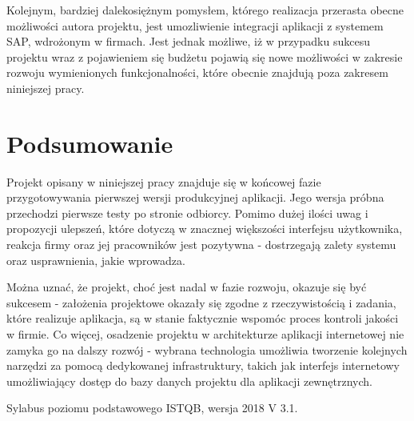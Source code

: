 \documentclass[declaration,shortabstract]{iithesis}
\begin{document}
Kolejnym, bardziej dalekosiężnym pomysłem, którego  realizacja przerasta obecne możliwości autora projektu, jest umozliwienie integracji aplikacji z systemem SAP, wdrożonym w firmach. 
Jest jednak możliwe, iż w przypadku sukcesu projektu wraz z pojawieniem się budżetu pojawią się nowe możliwości w zakresie rozwoju wymienionych funkcjonalności, które obecnie znajdują poza zakresem niniejszej pracy.

\chapter{Podsumowanie}
Projekt opisany w niniejszej pracy znajduje się w końcowej fazie przygotowywania pierwszej wersji produkcyjnej aplikacji.
Jego wersja próbna przechodzi pierwsze testy po stronie odbiorcy. Pomimo dużej ilości uwag i propozycji ulepszeń, które dotyczą w znacznej większości interfejsu użytkownika, reakcja firmy oraz jej pracowników jest pozytywna - dostrzegają zalety systemu oraz usprawnienia, jakie wprowadza.

Można uznać, że projekt, choć jest nadal w fazie rozwoju, okazuje się być sukcesem - założenia projektowe okazały się zgodne z rzeczywistością i zadania, które realizuje aplikacja, są w stanie faktycznie wspomóc proces kontroli jakości w firmie. Co więcej, osadzenie projektu w architekturze aplikacji internetowej nie zamyka go na dalszy rozwój - wybrana technologia umożliwia tworzenie kolejnych narzędzi za pomocą dedykowanej infrastruktury, takich jak interfejs internetowy umożliwiający dostęp do bazy danych projektu dla aplikacji zewnętrznych.

\begin{thebibliography}{1}
 Sylabus poziomu podstawowego ISTQB, wersja 2018 V 3.1.
\end{thebibliography}
\end{document}
